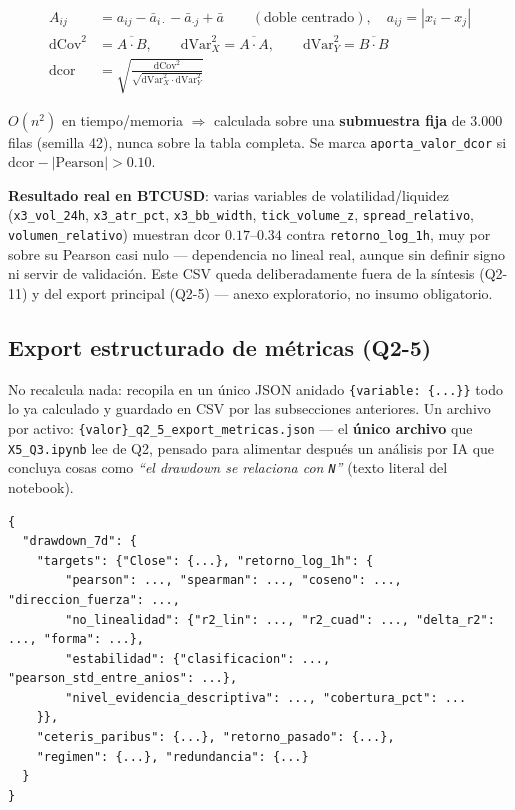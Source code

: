 \documentclass[11pt,a4paper]{article}
\newcommand{\code}[1]{\texttt{\small #1}}
\newcommand{\bigsep}{\par\vspace{3pt}}
\newcommand{\dq}[1]{\emph{``#1''}}
\begin{document}
\begin{align}
A_{ij} &= a_{ij} - \bar{a}_{i\cdot} - \bar{a}_{\cdot j} + \bar{a}
  \qquad (\text{doble centrado}),\quad a_{ij} = |x_i - x_j| \\
\mathrm{dCov}^2 &= \overline{A \cdot B}, \qquad \mathrm{dVar}_X^2 = \overline{A\cdot A},
  \qquad \mathrm{dVar}_Y^2 = \overline{B \cdot B} \\
\mathrm{dcor} &= \sqrt{\frac{\mathrm{dCov}^2}{\sqrt{\mathrm{dVar}_X^2 \cdot
  \mathrm{dVar}_Y^2}}}
\end{align}

\(O(n^2)\) en tiempo/memoria \(\Rightarrow\) calculada sobre una \textbf{submuestra fija}
de 3.000 filas (semilla 42), nunca sobre la tabla completa. Se marca
\code{aporta\_valor\_dcor} si \(\mathrm{dcor} - |\mathrm{Pearson}| > 0.10\).

\bigsep
\textbf{Resultado real en BTCUSD}: varias variables de volatilidad/liquidez
(\code{x3\_vol\_24h}, \code{x3\_atr\_pct}, \code{x3\_bb\_width}, \code{tick\_volume\_z},
\code{spread\_relativo}, \code{volumen\_relativo}) muestran \(\mathrm{dcor}\)
\(0.17\)–\(0.34\) contra \code{retorno\_log\_1h}, muy por sobre su Pearson casi nulo —
dependencia no lineal real, aunque sin definir signo ni servir de validación. Este CSV
queda deliberadamente fuera de la síntesis (Q2-11) y del export principal (Q2-5) — anexo
exploratorio, no insumo obligatorio.

\subsection{Export estructurado de métricas (Q2-5)}

No recalcula nada: recopila en un único JSON anidado \code{\{variable: \{...\}\}} todo lo
ya calculado y guardado en CSV por las subsecciones anteriores. Un archivo por activo:
\code{\{valor\}\_q2\_5\_export\_metricas.json} — el \textbf{único archivo} que
\code{X5\_Q3.ipynb} lee de Q2, pensado para alimentar después un análisis por IA que
concluya cosas como \dq{el drawdown se relaciona con \code{N}} (texto literal del
notebook).

\begin{lstlisting}
{
  "drawdown_7d": {
    "targets": {"Close": {...}, "retorno_log_1h": {
        "pearson": ..., "spearman": ..., "coseno": ..., "direccion_fuerza": ...,
        "no_linealidad": {"r2_lin": ..., "r2_cuad": ..., "delta_r2": ..., "forma": ...},
        "estabilidad": {"clasificacion": ..., "pearson_std_entre_anios": ...},
        "nivel_evidencia_descriptiva": ..., "cobertura_pct": ...
    }},
    "ceteris_paribus": {...}, "retorno_pasado": {...},
    "regimen": {...}, "redundancia": {...}
  }
}
\end{lstlisting}
\end{document}
